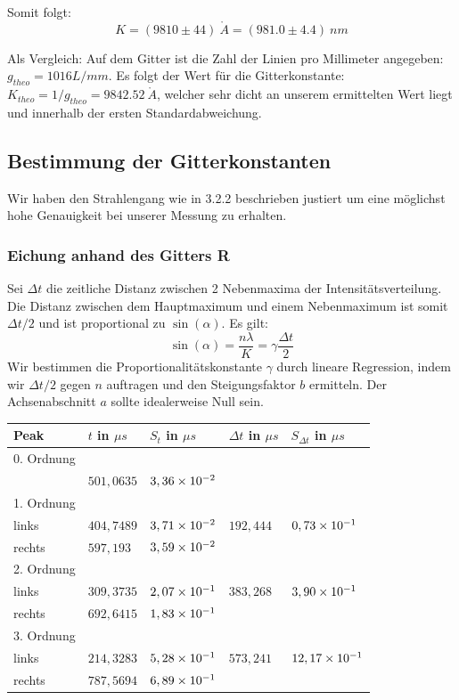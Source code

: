 Somit folgt: $$\boxed{K=(9810 \pm 44) \ \mathring A = (981.0 \pm 4.4) \ nm}$$

Als Vergleich: Auf dem Gitter ist die Zahl der Linien pro Millimeter angegeben: \\ $g_{theo}=1016 L/mm$. Es folgt der Wert f\"ur die Gitterkonstante: $K_{theo} = 1/g_{theo} = 9842.52 \ \mathring A$, welcher sehr dicht an unserem ermittelten Wert liegt und innerhalb der ersten Standardabweichung.

\subsection{Bestimmung der Gitterkonstanten}

Wir haben den Strahlengang wie in 3.2.2 beschrieben justiert um eine m\"oglichst hohe Genauigkeit bei unserer Messung zu erhalten.

\subsubsection{Eichung anhand des Gitters R}

Sei $\Delta t$ die zeitliche Distanz zwischen 2 Nebenmaxima der Intensit\"atsverteilung. Die Distanz zwischen dem Hauptmaximum und einem Nebenmaximum ist somit $\Delta t/2$ und ist proportional zu $\sin(\alpha)$. Es gilt: $$\sin(\alpha) = \frac{n\lambda}{K} = \gamma \frac{\Delta t}{2}$$
Wir bestimmen die Proportionalit\"atskonstante $\gamma$ durch lineare Regression, indem wir $\Delta t/2$ gegen $n$ auftragen und den Steigungsfaktor $b$ ermitteln. Der Achsenabschnitt $a$ sollte idealerweise Null sein.

\begin{center}
\begin{tabular}{lllll}
\toprule
Peak & $t$ in $\mu s$ & $S_t$ in $\mu s$ & $\Delta t$ in $\mu s$ & $S_{\Delta t}$ in $\mu s$ \\
\midrule
0. Ordnung \\
 & $501,0635$ & $3,36\times 10^{-2}$\\
\midrule
1. Ordnung\\
links & $404,7489$ & $3,71\times 10^{-2}$ & $192,444$ & $0,73\times 10^{-1}$\\
rechts & $597,193$ & $3,59\times 10^{-2}$\\
\midrule
2. Ordnung\\ 
links & $309,3735$ & $2,07\times 10^{-1}$ & $383,268$ & $3,90\times 10^{-1}$\\
rechts & $692,6415$ & $1,83\times 10^{-1}$\\
\midrule
3. Ordnung\\ 
links & $214,3283$ & $5,28\times 10^{-1}$ & $573,241$ & $12,17\times 10^{-1}$\\
rechts & $787,5694$ & $6,89\times 10^{-1}$\\
\bottomrule
\end{tabular}
\end{center}

